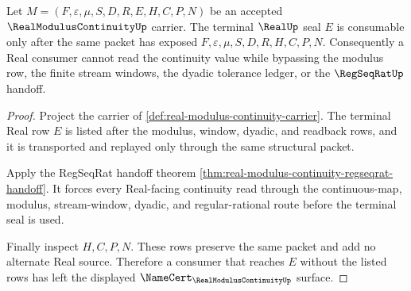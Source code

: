 \begin{theorem}
\label{thm:real-modulus-continuity-real-seal}
Let $M=(F,\varepsilon,\mu,S,D,R,E,H,C,P,N)$ be an accepted $\RealModulusContinuityUp$ carrier. The terminal $\RealUp$ seal $E$ is consumable only after the same packet has exposed $F,\varepsilon,\mu,S,D,R,H,C,P,N$. Consequently a Real consumer cannot read the continuity value while bypassing the modulus row, the finite stream windows, the dyadic tolerance ledger, or the $\RegSeqRatUp$ handoff.
\end{theorem}
\begin{proof}
Project the carrier of \autoref{def:real-modulus-continuity-carrier}. The terminal Real row $E$ is listed after the modulus, window, dyadic, and readback rows, and it is transported and replayed only through the same structural packet.

Apply the RegSeqRat handoff theorem \autoref{thm:real-modulus-continuity-regseqrat-handoff}. It forces every Real-facing continuity read through the continuous-map, modulus, stream-window, dyadic, and regular-rational route before the terminal seal is used.

Finally inspect $H,C,P,N$. These rows preserve the same packet and add no alternate Real source. Therefore a consumer that reaches $E$ without the listed rows has left the displayed $\NameCert_{\RealModulusContinuityUp}$ surface.
\end{proof}




